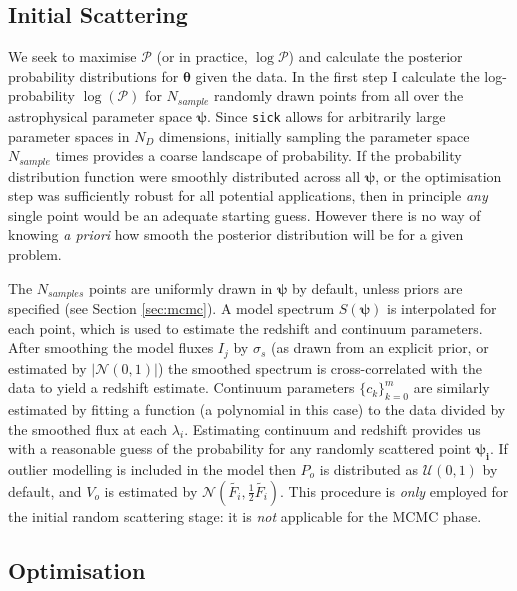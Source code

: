 \documentclass[iop]{emulateapj}
\newcommand{\sick}{\texttt{sick}}
\begin{document}
\subsection{Initial Scattering}
\label{sec:scattering}

We seek to maximise $\mathcal{P}$ (or in practice, $\log\mathcal{P}$) and calculate
the posterior probability distributions for $\bm{\theta}$ given the data. In the 
first step I calculate the log-probability $\log{(\mathcal{P})}$ for $N_{sample}$ 
randomly drawn points from all over the astrophysical parameter space $\bm{\psi}$. 
Since \sick{} allows for arbitrarily large parameter spaces in $N_{D}$ dimensions, 
initially sampling the parameter space $N_{sample}$ times provides a coarse 
landscape of probability. If the probability distribution function were smoothly 
distributed across all $\bm{\psi}$, or the optimisation step was sufficiently 
robust for all potential applications, then in principle \textit{any} single 
point would be an adequate starting guess. However there is no way of knowing 
\textit{a priori} how smooth the posterior distribution will be for a given problem. 

The $N_{samples}$ points are uniformly drawn in $\bm{\psi}$ by default, unless 
priors are specified (see Section \ref{sec:mcmc}). A model spectrum $S(\bm{\psi})$ 
is interpolated for each point, which is used to estimate the redshift and continuum 
parameters. After smoothing the model fluxes $I_j$ by $\sigma_s$ (as drawn from an 
explicit prior, or estimated by $\left|\mathcal{N}\left(0, 1\right)\right|$) the 
smoothed spectrum is cross-correlated with the data to yield a redshift estimate. 
Continuum parameters $\{c_k\}_{k=0}^{m}$ are similarly estimated by fitting a 
function (a polynomial in this case) to the data divided by the smoothed flux at 
each $\lambda_i$. Estimating continuum and redshift provides us with a reasonable 
guess of the probability for any randomly scattered point $\bm{\psi_i}$. If outlier 
modelling is included in the model then $P_o$ is distributed as 
$\mathcal{U}\left(0, 1\right)$ by default, and $V_o$ is estimated by 
$\mathcal{N}\left(\widetilde{F_i}, \frac{1}{2}\widetilde{F_i}\right)$. This procedure 
is \textit{only} employed for the initial random scattering stage: it is 
\textit{not} applicable for the MCMC phase. 

\subsection{Optimisation}
\label{sec:optimise}
\end{document}

